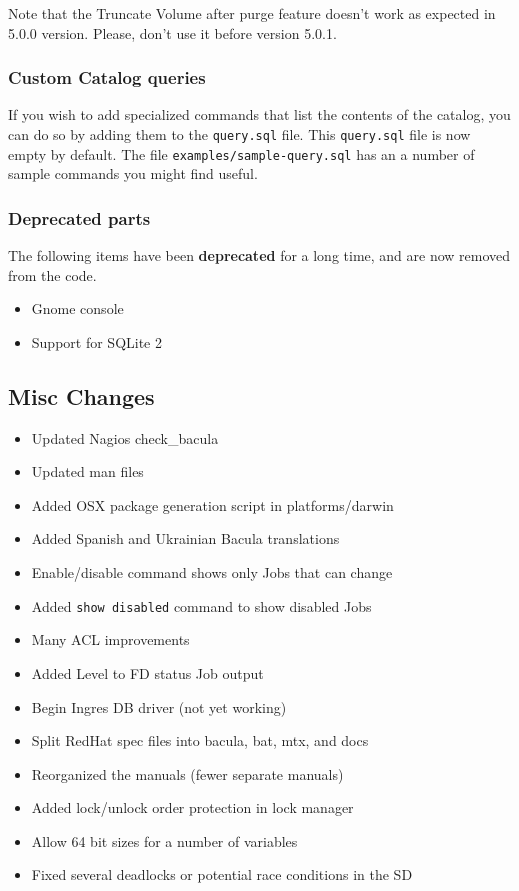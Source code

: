 Note that the Truncate Volume after purge feature doesn't work as expected
in 5.0.0 version. Please, don't use it before version 5.0.1.

\subsubsection{Custom Catalog queries}

If you wish to add specialized commands that list the contents of the catalog,
you can do so by adding them to the \texttt{query.sql} file. This
\texttt{query.sql} file is now empty by default.  The file
\texttt{examples/sample-query.sql} has an a number of sample commands
you might find useful.

\subsubsection{Deprecated parts}

The following items have been \textbf{deprecated} for a long time, and are now
removed from the code.
\begin{itemize}
\item Gnome console
\item Support for SQLite 2
\end{itemize}

\subsection{Misc Changes}
\label{sec:miscchanges}

\begin{itemize}
\item Updated Nagios check\_bacula
\item Updated man files
\item Added OSX package generation script in platforms/darwin
\item Added Spanish and Ukrainian Bacula translations
\item Enable/disable command shows only Jobs that can change
\item Added \texttt{show disabled} command to show disabled Jobs
\item Many ACL improvements
\item Added Level to FD status Job output
\item Begin Ingres DB driver (not yet working)
\item Split RedHat spec files into bacula, bat, mtx, and docs
\item Reorganized the manuals (fewer separate manuals)
\item Added lock/unlock order protection in lock manager
\item Allow 64 bit sizes for a number of variables
\item Fixed several deadlocks or potential race conditions in the SD
\end{itemize}

